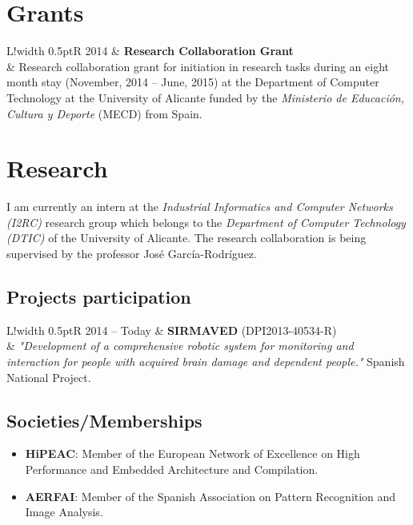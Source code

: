 \documentclass[8pt]{article}
\newcommand\VRule{\color{lightgray}\vrule width 0.5pt}
\begin{document}
\section*{Grants}
\begin{tabular}{L!{\VRule}R}
2014 & \textbf{Research Collaboration Grant}\\
& Research collaboration grant for initiation in research tasks during an eight month stay (November, 2014 -- June, 2015) at the Department of Computer Technology at the University of Alicante funded by the \textit{Ministerio de Educación, Cultura y Deporte} (MECD) from Spain.
\end{tabular}

\section*{Research}

I am currently an intern at the \textit{Industrial Informatics and Computer Networks (I2RC)} research group which belongs to the \textit{Department of Computer Technology (DTIC)} of the University of Alicante. The research collaboration is being supervised by the professor José García-Rodríguez.

\subsection*{Projects participation}

\begin{tabular}{L!{\VRule}R}
	2014 -- Today & \textbf{SIRMAVED} (DPI2013-40534-R)\\
	& \textit{"Development of a comprehensive robotic system for monitoring and interaction for people with acquired brain damage and dependent people."} Spanish National Project. \\
\end{tabular}

\subsection*{Societies/Memberships}

\begin{itemize}
	\item \textbf{HiPEAC}: Member of the European Network of Excellence on High Performance and Embedded Architecture and Compilation.
	\item \textbf{AERFAI}: Member of the Spanish Association on Pattern Recognition and Image Analysis.
\end{itemize}
\end{document}
